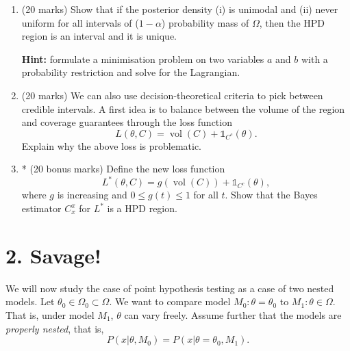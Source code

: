 \documentclass[a4paper,10pt, notitlepage]{report}
\newif\ifanswers
\begin{document}
\begin{enumerate}[label=\alph*)]
 \item (20 marks) Show that if the posterior density  (i) is unimodal and (ii) never uniform for all intervals of ($1 - \alpha$) probability mass of $\Omega$, then the HPD region is an interval and it is unique.
 
 \textbf{Hint:} formulate a minimisation problem on two variables $a$ and $b$ with a probability restriction and solve for the Lagrangian.

 \item (20 marks) We can also use decision-theoretical criteria to pick between credible intervals.
 A first idea is to balance between the volume of the region and coverage guarantees through the loss function $$L(\theta, C) = \operatorname{vol}(C) + \mathds{1}_{C^c}(\theta).$$
 Explain why the above loss is problematic.
 \item * (20 bonus marks) Define the new loss function $$L^*(\theta, C) = g\left(\operatorname{vol}(C)\right) + \mathds{1}_{C^c}(\theta),$$
 where $g$ is increasing and $0 \leq g(t) \leq 1$ for all $t$. Show that the Bayes estimator $C^\pi_x$ for $L^*$ is a HPD region. 
\end{enumerate}
\ifanswers
\nocite{*}

\fi

\section*{2. Savage!} 

We will now study the case of point hypothesis testing as a case of two nested models.
Let $\theta_0 \in \Omega_0 \subset \Omega$.
We want to compare model $M_0: \theta = \theta_0$ to $M_1: \theta \in \Omega$.
That is, under model $M_1$, $\theta$ can vary freely.
Assume further that the models are \textit{properly nested}, that is, 
$$P(x | \theta, M_0) = P(x | \theta = \theta_0, M_1).$$
\end{document}
